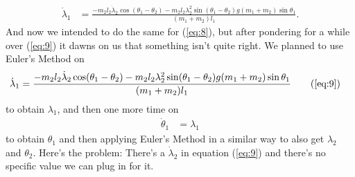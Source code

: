 \documentclass[paper=a4, fontsize=11pt]{scrartcl} %
\numberwithin{equation}{section} %
\numberwithin{figure}{section} %
\numberwithin{table}{section} %
\begin{document}
\begin{align} \label{eq:9}
   \dot{\lambda}_1 &= \frac{- m_2 l_2 \dot{\lambda}_2 \cos(\theta_1 - \theta_2) - m_2 l_2 \lambda^2_2 \sin(\theta_1 - \theta_2) g (m_1 + m_2) \sin \theta_1}{(m_1 + m_2) l_1}.
\end{align}
And now we intended to do the same for (\ref{eq:8}), but after pondering for a while over (\ref{eq:9}) it dawns on us that something isn't quite right.
We planned to use Euler's Method on
\begin{align} 
  \dot{\lambda}_1 &= \frac{- m_2 l_2 \dot{\lambda}_2 \cos(\theta_1 - \theta_2) - m_2 l_2 \lambda^2_2 \sin(\theta_1 - \theta_2) g (m_1 + m_2) \sin \theta_1}{(m_1 + m_2) l_1} \tag{\ref{eq:9}}
\end{align}
to obtain $\lambda_1$, and then one more time on
\begin{align} 
  \dot{\theta}_1 &= \lambda_1 \label{eq:10} 
\end{align}
to obtain $\theta_1$ and then applying Euler's Method in a similar way to also get $\lambda_2$ and $\theta_2$. Here's the problem: There's a $\dot{\lambda}_2$ in equation (\ref{eq:9}) and there's no specific value we can plug in 
for it.
\end{document}
